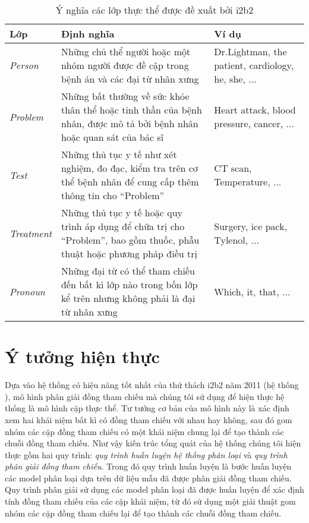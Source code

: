 \begin{table}[th]
\centering{}
\caption{Ý nghĩa các lớp thực thể được đề xuất bởi i2b2\label{tab:EntityLabels}}
\footnotesize\sffamily

\begin{tabularx}{\textwidth}{@{}lLP{\colleft}{0.3}@{}}
\toprule
\textbf{Lớp} & \textbf{Định nghĩa} & \textbf{Ví dụ}\\
\midrule
\emph{Person} & Những chủ thể người hoặc một nhóm người được đề cập trong bệnh án và các đại từ nhân xưng & Dr.Lightman, the patient, cardiology, he, she, ...\\
\emph{Problem} & Những bất thường về sức khỏe thân thể hoặc tinh thần của bệnh nhân, được mô tả bởi bệnh nhân hoặc quan sát của bác sĩ & Heart attack, blood pressure, cancer, ...\\
\emph{Test} & Những thủ tục y tế như xét nghiệm, đo đạc, kiểm tra trên cơ thể bệnh nhân để cung cấp thêm thông tin cho ``Problem'' & CT scan, Temperature, ...\\
\emph{Treatment} & Những thủ tục y tế hoặc quy trình áp dụng để chữa trị cho ``Problem'', bao gồm thuốc, phẫu thuật hoặc phương pháp điều trị & Surgery, ice pack, Tylenol, ...\\
\emph{Pronoun} & Những đại từ có thể tham chiếu đến bất kì lớp nào trong bốn lớp kể trên nhưng không phải là đại từ nhân xưng & Which, it, that, ...\\
\bottomrule
\end{tabularx}
\end{table}

\section{Ý tưởng hiện thực\label{ytuonghienthuc}}
Dựa vào hệ thống có hiệu năng tốt nhất của thử thách i2b2 năm 2011 (hệ thống \cite{YanXu2012}), mô hình phân giải đồng tham chiếu mà chúng tôi sử dụng để hiện thực hệ thống là mô hình cặp thực thể. Tư tưởng cơ bản của mô hình này là xác định xem hai khái niệm bất kì có đồng tham chiếu với nhau hay không, sau đó gom nhóm các cặp đồng tham chiếu có một khái niệm chung lại để tạo thành các chuỗi đồng tham chiếu. Như vậy kiến trúc tổng quát của hệ thống chúng tôi hiện thực gồm hai quy trình: \emph{quy trình huấn luyện hệ thống phân loại} và \emph{quy trình phân giải đồng tham chiếu}. Trong đó quy trình huấn luyện là bước huấn luyện các model phân loại dựa trên dữ liệu mẫu đã được phân giải đồng tham chiếu. Quy trình phân giải sử dụng các model phân loại đã được huấn luyện để xác định tính đồng tham chiếu của các cặp khái niệm, từ đó sử dụng một giải thuật gom nhóm các cặp đồng tham chiếu lại để tạo thành các chuỗi đồng tham chiếu.

